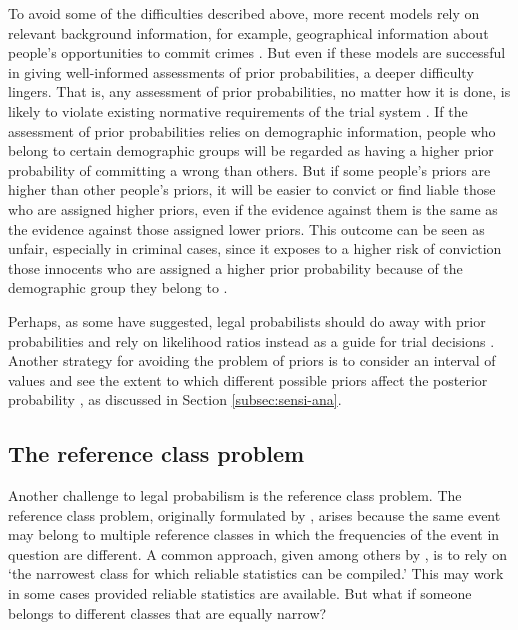\documentclass{article}
\begin{document}
 
 
 
 To avoid some of the difficulties described above, more recent models rely on relevant background information, for example, geographical information  about people's opportunities to commit crimes \citep{fenton2019OpportunityPriorProofbased}. 
 But even if these models are successful in giving well-informed assessments of prior probabilities, a deeper difficulty lingers. That is, any assessment of prior probabilities, no matter how it is done, is likely to violate existing normative requirements of the trial system \citep{dahlman2017, engel2012NeglectBaseRate,schweizer2013LawDoesnSay}. If the assessment of prior probabilities relies on demographic information, people who belong to certain demographic groups will be regarded as having a higher prior probability of committing a wrong than others. %
 But if 
 some people's priors are higher than other people's priors, 
 it will be easier to convict or find liable those who are assigned higher priors, even if the evidence against them is the same as the evidence against those assigned lower priors.
 This outcome can be seen as unfair, especially in criminal cases, since it exposes to a higher risk of conviction those innocents who are assigned a higher prior probability  because of the demographic group they belong to \citep{DiBelloONeil2020}. 
 
 Perhaps, as some have suggested, legal probabilists should do away with prior probabilities and rely on likelihood ratios instead as a guide for trial decisions  \citep{sullivan2016LikelihoodStoryTheory}. Another strategy for avoiding the problem of priors is to consider an interval of values and see the extent to which different possible priors affect the posterior probability \citep{Finkelstein1970A}, as discussed in Section \ref{subsec:sensi-ana}.
 





\subsection{The reference class problem}

\label{sec:reference}


Another challenge to legal probabilism is the reference class problem. 
The reference class problem, originally formulated by  \cite{venn1866logic}, arises because the same event may belong to multiple reference  classes in which the frequencies of the event in question are different. A common approach, given among others by \citet[374]{Reichenbach1949}, is to rely on `the narrowest class for which reliable statistics can be compiled.' 
This may work in some cases provided reliable statistics are available. 
But what if someone belongs to different classes that are equally narrow? 
\end{document}
